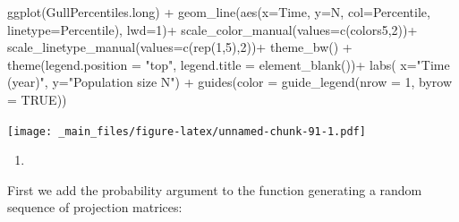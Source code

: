 \documentclass[
]{book}
\newenvironment{Shaded}{\begin{snugshade}}{\end{snugshade}}
\newcommand{\AttributeTok}[1]{\textcolor[rgb]{0.77,0.63,0.00}{#1}}
\newcommand{\ConstantTok}[1]{\textcolor[rgb]{0.00,0.00,0.00}{#1}}
\newcommand{\DecValTok}[1]{\textcolor[rgb]{0.00,0.00,0.81}{#1}}
\newcommand{\FunctionTok}[1]{\textcolor[rgb]{0.00,0.00,0.00}{#1}}
\newcommand{\NormalTok}[1]{#1}
\newcommand{\SpecialCharTok}[1]{\textcolor[rgb]{0.00,0.00,0.00}{#1}}
\newcommand{\StringTok}[1]{\textcolor[rgb]{0.31,0.60,0.02}{#1}}
\providecommand{\tightlist}{%
  \setlength{\itemsep}{0pt}\setlength{\parskip}{0pt}}
\begin{document}
\begin{Shaded}
\begin{Highlighting}[]
\FunctionTok{ggplot}\NormalTok{(GullPercentiles.long) }\SpecialCharTok{+} 
  \FunctionTok{geom\_line}\NormalTok{(}\FunctionTok{aes}\NormalTok{(}\AttributeTok{x=}\NormalTok{Time, }\AttributeTok{y=}\NormalTok{N, }\AttributeTok{col=}\NormalTok{Percentile,}
                \AttributeTok{linetype=}\NormalTok{Percentile), }\AttributeTok{lwd=}\DecValTok{1}\NormalTok{)}\SpecialCharTok{+}
  \FunctionTok{scale\_color\_manual}\NormalTok{(}\AttributeTok{values=}\FunctionTok{c}\NormalTok{(colors5,}\DecValTok{2}\NormalTok{))}\SpecialCharTok{+}
  \FunctionTok{scale\_linetype\_manual}\NormalTok{(}\AttributeTok{values=}\FunctionTok{c}\NormalTok{(}\FunctionTok{rep}\NormalTok{(}\DecValTok{1}\NormalTok{,}\DecValTok{5}\NormalTok{),}\DecValTok{2}\NormalTok{))}\SpecialCharTok{+}
  \FunctionTok{theme\_bw}\NormalTok{() }\SpecialCharTok{+}
   \FunctionTok{theme}\NormalTok{(}\AttributeTok{legend.position =} \StringTok{"top"}\NormalTok{,}
         \AttributeTok{legend.title =} \FunctionTok{element\_blank}\NormalTok{())}\SpecialCharTok{+}
  \FunctionTok{labs}\NormalTok{( }\AttributeTok{x=}\StringTok{"Time (year)"}\NormalTok{, }\AttributeTok{y=}\StringTok{"Population size N"}\NormalTok{) }\SpecialCharTok{+}
   \FunctionTok{guides}\NormalTok{(}\AttributeTok{color =} \FunctionTok{guide\_legend}\NormalTok{(}\AttributeTok{nrow =} \DecValTok{1}\NormalTok{, }\AttributeTok{byrow =} \ConstantTok{TRUE}\NormalTok{))}
\end{Highlighting}
\end{Shaded}

\texttt{[image: \_main\_files/figure-latex/unnamed-chunk-91-1.pdf]}

\begin{enumerate}
\def\labelenumi{\arabic{enumi}.}
\setcounter{enumi}{3}
\tightlist
\item
\end{enumerate}

First we add the probability argument to the function generating a random sequence of projection matrices:
\end{document}
